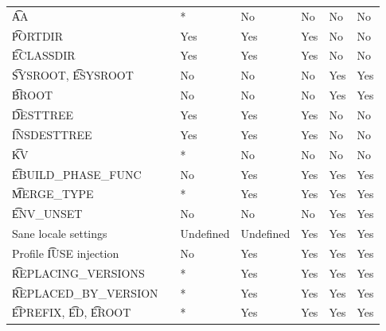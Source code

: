 \begin{landscape}
\begin{longtable}{llP{7.5em}P{7.5em}P{7.5em}P{7.5em}P{7.5em}}
\t{AA} &  &
    * & No & No & No & No \\

\t{PORTDIR} &  &
    Yes & Yes & Yes & No & No \\

\t{ECLASSDIR} &  &
    Yes & Yes & Yes & No & No \\

\t{SYSROOT}, \t{ESYSROOT} &  &
    No & No & No & Yes & Yes \\

\t{BROOT} &  &
    No & No & No & Yes & Yes \\

\t{DESTTREE} &  &
    Yes & Yes & Yes & No & No \\

\t{INSDESTTREE} &  &
    Yes & Yes & Yes & No & No \\

\t{KV} &  &
    * & No & No & No & No \\

\t{EBUILD_PHASE_FUNC} &  &
    No & Yes & Yes & Yes & Yes \\

\t{MERGE_TYPE} &  &
    * & Yes & Yes & Yes & Yes \\

\t{ENV_UNSET} &  &
    No & No & No & Yes & Yes \\

Sane locale settings &  &
    Undefined & Undefined & Yes & Yes & Yes \\

Profile \t{IUSE} injection &  &
    No & Yes & Yes & Yes & Yes \\

\t{REPLACING_VERSIONS} &  &
    * & Yes & Yes & Yes & Yes \\

\t{REPLACED_BY_VERSION} &  &
    * & Yes & Yes & Yes & Yes \\

\t{EPREFIX}, \t{ED}, \t{EROOT} &  &
    * & Yes & Yes & Yes & Yes \\


\end{longtable}
\end{landscape}
